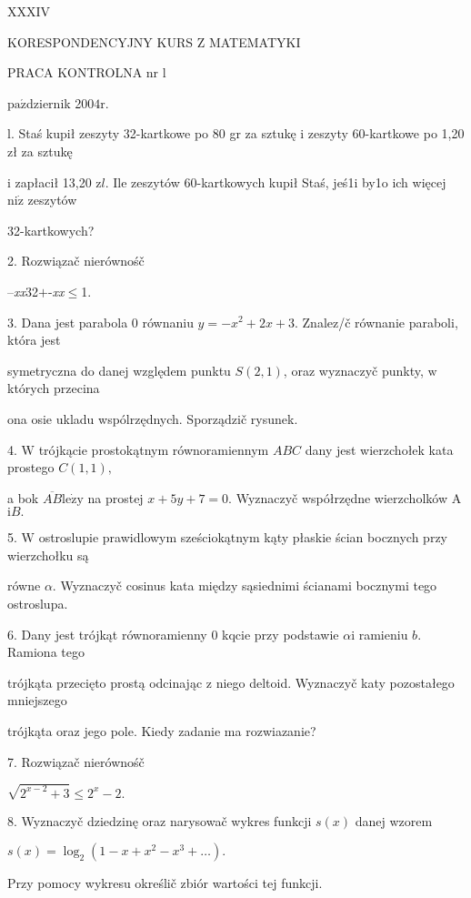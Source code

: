 \documentclass[a4paper,12pt]{article}
\begin{document}
XXXIV

KORESPONDENCYJNY KURS Z MATEMATYKI

PRACA KONTROLNA nr l

$\mathrm{p}\mathrm{a}\acute{\mathrm{z}}$dziernik 2$004\mathrm{r}.$

l. Staś kupił zeszyty 32-kartkowe po 80 gr za sztukę $\mathrm{i}$ zeszyty 60-kartkowe po 1,20 zł za sztukę

$\mathrm{i}$ zapłacił 13,20 $\mathrm{z}l$. Ile zeszytów 60-kartkowych kupił Staś, jeś1i by1o ich więcej $\mathrm{n}\mathrm{i}\dot{\mathrm{z}}$ zeszytów

32-kartkowych?

2. Rozwiązač nierównośč

--{\it xx}32$+$-{\it xx}$\leq$1.

3. Dana jest parabola $0$ równaniu $y = -x^{2}+2x+3$. Znalez/č równanie paraboli, która jest

symetryczna do danej względem punktu $S(2,1)$, oraz wyznaczyč punkty, $\mathrm{w}$ których przecina

ona osie ukladu wspólrzędnych. Sporządzič rysunek.

4. $\mathrm{W}$ trójkącie prostokątnym równoramiennym $ABC$ dany jest wierzchołek kata prostego $C(1,1),$

a bok $\overline{AB}\mathrm{l}\mathrm{e}\dot{\mathrm{z}}\mathrm{y}$ na prostej $x+5y+7=0$. Wyznaczyč współrzędne wierzcholków A $\mathrm{i}B.$

5. $\mathrm{W}$ ostroslupie prawidlowym sześciokątnym kąty płaskie ścian bocznych przy wierzchołku są

równe $\alpha$. Wyznaczyč cosinus kata między sąsiednimi ścianami bocznymi tego ostroslupa.

6. Dany jest trójkąt równoramienny $0$ kqcie przy podstawie $\alpha \mathrm{i}$ ramieniu $b$. Ramiona tego

trójkąta przecięto prostą odcinając $\mathrm{z}$ niego deltoid. Wyznaczyč katy pozostałego mniejszego

trójkąta oraz jego pole. Kiedy zadanie ma rozwiazanie?

7. Rozwiązač nierównośč

$\sqrt{2^{x-2}+3}\leq 2^{x}-2.$

8. Wyznaczyč dziedzinę oraz narysowač wykres funkcji $s(x)$ danej wzorem

$s(x)=\log_{2}(1-x+x^{2}-x^{3}+\ldots).$

Przy pomocy wykresu określič zbiór wartości tej funkcji.
\end{document}
